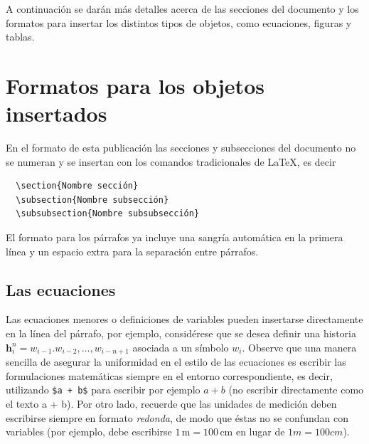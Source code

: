 \documentclass[esp]{FCEFyN-class}
\newcommand{\vect}[1]{\mathbf{#1}}  %
\begin{document}
A continuación se darán más detalles acerca de las secciones del documento y los formatos para 
insertar los distintos tipos de objetos, como ecuaciones, figuras y tablas.


\section{Formatos para los objetos insertados}
En el formato de esta publicación las secciones y subsecciones del documento no se numeran y 
se insertan con los comandos tradicionales de \LaTeX, es decir
\begin{verbatim}
  \section{Nombre sección}
  \subsection{Nombre subsección}
  \subsubsection{Nombre subsubsección}
\end{verbatim}
El formato para los párrafos ya incluye una sangría 
automática en la primera línea y un espacio extra para la separación entre párrafos.

\subsection{Las ecuaciones}
Las ecuaciones menores o definiciones de variables pueden insertarse directamente en la línea del
párrafo, por ejemplo, considérese que se desea definir una historia $\vect{h}_i^n = w_{i-1}. w_{i-2},
\dots, w_{i-n+1}$ asociada a un símbolo $w_i$. Observe que una manera sencilla de asegurar la 
uniformidad en el estilo de las ecuaciones es escribir las formulaciones matemáticas siempre en el
entorno correspondiente, es decir, utilizando \verb!$a + b$! para escribir por ejemplo $a + b$
(no escribir directamente como el texto a + b). Por otro lado, recuerde que las unidades de medición
deben escribirse siempre en formato \emph{redonda}, de modo que éstas no se confundan con variables
(por ejemplo, debe escribirse $1\,\text{m} = 100\,\text{cm}$ en lugar de $1m = 100cm$).
\end{document}
